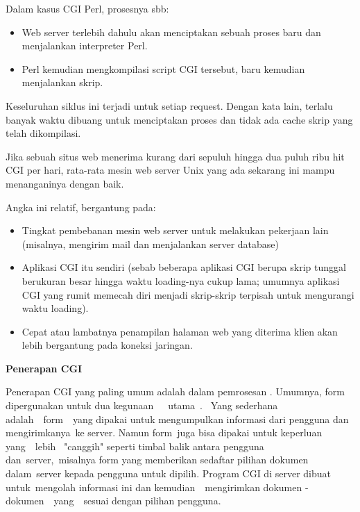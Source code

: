 \documentclass{wileySix}
\begin{document}
\vspace{12pt}
\noindent 
Dalam kasus CGI Perl, prosesnya sbb: \par
\noindent 
\begin{itemize}
	\item Web server terlebih dahulu akan menciptakan sebuah proses baru dan menjalankan interpreter Perl.  \par
	\noindent 
	\item Perl kemudian mengkompilasi script CGI tersebut, baru kemudian menjalankan skrip.\end{itemize}
\par
\noindent 
Keseluruhan siklus ini terjadi untuk setiap request. Dengan kata lain, terlalu banyak waktu dibuang untuk menciptakan proses dan tidak ada cache skrip yang telah dikompilasi. \par
\noindent 
Jika sebuah situs web menerima kurang dari sepuluh hingga dua puluh ribu hit CGI per hari, rata-rata mesin web server Unix yang ada sekarang ini mampu menanganinya dengan baik. \par
\noindent 
Angka ini relatif, bergantung pada: \par
\noindent 
\begin{itemize}
	\item Tingkat pembebanan mesin web server untuk melakukan pekerjaan lain (misalnya, mengirim mail dan menjalankan server database) \par
	\noindent 
	\item Aplikasi CGI itu sendiri (sebab beberapa aplikasi CGI berupa skrip tunggal berukuran besar hingga waktu loading-nya cukup lama; umumnya aplikasi CGI yang rumit memecah diri menjadi skrip-skrip terpisah untuk mengurangi waktu loading). \par
	\noindent 
	\item Cepat atau lambatnya penampilan halaman web yang diterima klien akan lebih bergantung pada koneksi jaringan.\end{itemize}
\par
\vspace{12pt}
\noindent 
\textbf{Penerapan CGI} \par
Penerapan CGI yang paling umum adalah dalam pemrosesan . Umumnya, form dipergunakan untuk dua kegunaan~~~utama~.~ Yang  sederhana  adalah~~form~~yang  dipakai  untuk mengumpulkan informasi dari pengguna dan mengirimkanya~ke server. Namun  form~juga bisa dipakai untuk keperluan  yang~~lebih~ "canggih"  seperti timbal balik antara pengguna dan~server,~misalnya  form  yang memberikan sedaftar pilihan dokumen dalam~server kepada pengguna  untuk dipilih. Program CGI di server dibuat untuk~mengolah informasi ini  dan kemudian~~mengirimkan  dokumen - dokumen~~yang~~sesuai  dengan  pilihan pengguna. \par
\end{document}
